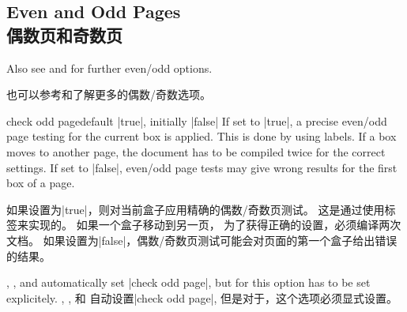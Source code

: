 \setcounter{section}{4}
\setcounter{subsection}{21}
\setcounter{subsubsection}{0}

\subsection{Even and Odd Pages\\偶数页和奇数页}
 
\begin{marker}
Also see  and  for further even/odd options.

也可以参考和了解更多的偶数/奇数选项。
\end{marker}

\begin{docTcbKey}[][doc updated=2015-11-13]{check odd page}{}{default |true|, initially |false|}
If set to |true|, a precise even/odd page testing for the current box is applied. 
This is done by using labels. If a box moves to another page,
the document has to be compiled twice for the correct settings.
If set to |false|, even/odd page tests may give wrong results for the first box of a page.


如果设置为|true|，则对当前盒子应用精确的偶数/奇数页测试。%
这是通过使用标签来实现的。%
如果一个盒子移动到另一页，%
为了获得正确的设置，必须编译两次文档。%
如果设置为|false|，偶数/奇数页测试可能会对页面的第一个盒子给出错误的结果。

 ,
 , and
 automatically set |check odd page|, but for
  this option has to be set explicitely.
,
, 和
自动设置|check odd page|, 但是对于，这个选项必须显式设置。
\end{docTcbKey}


